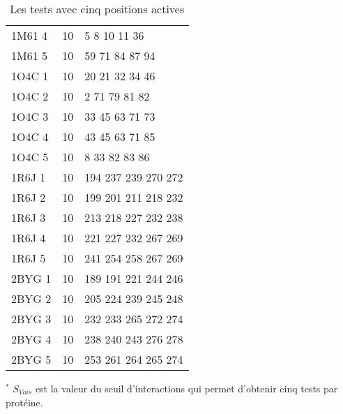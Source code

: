 \begin{table}[!htbp]
{\begin{tabular}{lll}
        1M61 4 & 10 & 5 8 10 11 36 \\
        1M61 5 & 10 & 59 71 84 87 94 \\
        1O4C 1 & 10 & 20 21 32 34 46 \\
        1O4C 2 & 10 & 2 71 79 81 82 \\
        1O4C 3 & 10 & 33 45 63 71 73 \\
        1O4C 4 & 10 & 43 45 63 71 85 \\
        1O4C 5 & 10 & 8 33 82 83 86 \\
        1R6J 1 & 10 & 194 237 239 270 272 \\
        1R6J 2 & 10 & 199 201 211 218 232 \\
        1R6J 3 & 10 & 213 218 227 232 238 \\
        1R6J 4 & 10 & 221 227 232 267 269 \\
        1R6J 5 & 10 & 241 254 258 267 269 \\
        2BYG 1 & 10 & 189 191 221 244 246 \\
        2BYG 2 & 10 & 205 224 239 245 248 \\
        2BYG 3 & 10 & 232 233 265 272 274 \\
        2BYG 4 & 10 & 238 240 243 276 278 \\
        2BYG 5 & 10 & 253 261 264 265 274 \\

        \bottomrule

      \end{tabular}      
}
      \caption{Les tests avec cinq positions actives}
\label{tab:test5}      
    \end{table}


\bigskip

{\raggedright

$^*$ $S_{Vois}$ est la valeur du seuil d'interactions qui permet d'obtenir cinq tests par protéine.

}




